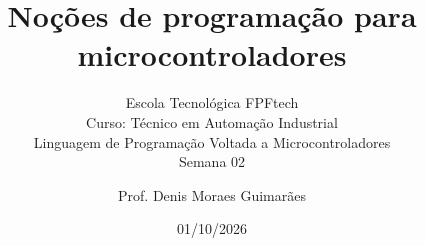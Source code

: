\title{Noções de programação para microcontroladores}
\subtitle{\texorpdfstring{Escola Tecnológica FPFtech\\[0.2cm]
Curso: Técnico em Automação Industrial\\[0.2cm]
\small Linguagem de Programação Voltada a Microcontroladores\\[0.15cm]
Semana 02}{FPFtech — Técnico em Automação Industrial — Semana 02}}
\author{Prof. Denis Moraes Guimarães}
\date{01/10/2026}
